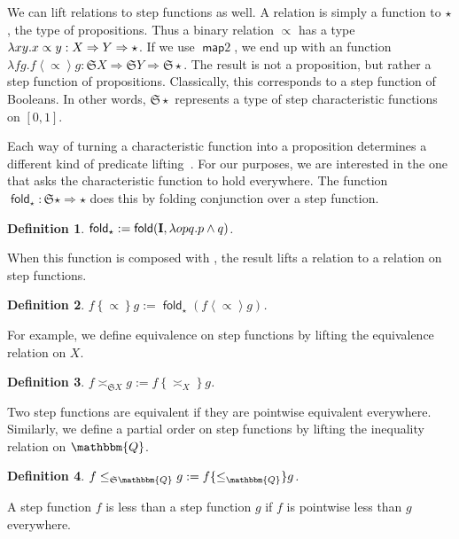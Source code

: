 \documentclass{elsarticle}
\newcommand{\assign}{:=}
\newcommand{\op}[1]{#1}
\newcommand{\tmop}[1]{\ensuremath{\operatorname{#1}}}
\newcommand{\tmstrong}[1]{\textbf{#1}}
\newcommand{\tmtextsf}[1]{{\sffamily{#1}}}
\newcommand{\tmtextup}[1]{{\upshape{#1}}}
\newtheorem{definition}{Definition}
\newcommand{\Prop}{\ensuremath{\op{\star}}}
\newcommand{\maptwo}[1]{\ensuremath{\left\langle #1 \right\rangle}}
\newcommand{\foldmaptwo}[1]{\ensuremath{\left\{ #1 \right\}}}
\newcommand{\SF}{\ensuremath{\mathfrak{S}}}
\newcommand{\id}{\text{{\tmstrong{\tmtextup{I}}}}}
\begin{document}
We can lift relations to step functions as well. A relation is simply a
function to $\Prop$, the type of propositions. Thus a binary relation
$\propto$ has a type $\lambda x y. x \propto y : X \Rightarrow {\nobreak} Y
\Rightarrow {\nobreak} \Prop$. If we use $\tmop{\mathsf{map} 2}$, we end up
with an function $\lambda f g. f \maptwo{\op{\propto}} g : \SF X \Rightarrow
\SF Y \Rightarrow \SF \Prop$. The result is not a proposition, but rather a
step function of propositions. Classically, this corresponds to a step
function of Booleans. In other words, $\SF \Prop$ represents a type of step
characteristic functions on $[0,1]$.

Each way of turning a characteristic function into a proposition determines a
different kind of predicate lifting~{\cite{Schroder:2005}}. For our purposes,
we are interested in the one that asks the characteristic function to hold
everywhere. The function $\tmop{\mathsf{fold}}_{\Prop} : \SF
\Prop \Rightarrow \Prop$ does this by folding conjunction over a step
function.

\begin{definition}
  $\tmop{\mathsf{fold}}_{\Prop} \assign \tmop{\mathsf{fold}} ( \id, \lambda o
  p q. p \wedge q)$.
\end{definition}

When this function is composed with \tmtextsf{map2}, the result lifts a
relation to a relation on step functions.

\begin{definition}
  $f \foldmaptwo{\op{\propto}} g \assign
  \tmop{\mathsf{fold}}_{\Prop} (f \maptwo{\op{\propto}} g)$.
\end{definition}

For example, we define equivalence on step functions by lifting the
equivalence relation on $X$.

\begin{definition}
  $f \asymp_{\mathfrak{S}X} g \assign f \foldmaptwo{\op{\asymp_X}} g$.
\end{definition}

Two step functions are equivalent if they are pointwise equivalent everywhere.
Similarly, we define a partial order on step functions by lifting the
inequality relation on $\mathbbm{Q}$.

\begin{definition}
  $f \leq_{\SF \mathbbm{Q}} g \assign f\{\leq_{\mathbbm{Q}}\}g$.
\end{definition}

A step function $f$ is less than a step function $g$ if $f$ is pointwise less
than $g$ everywhere.
\end{document}
